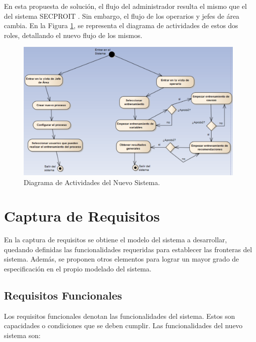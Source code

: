 En esta propuesta de solución, el flujo del administrador resulta el mismo que el del sistema SECPROIT \cite{elena}. Sin embargo, el flujo de los operarios y jefes de área cambia. En la Figura \ref{fig:actividades}, se representa el diagrama de actividades de estos dos roles, detallando el nuevo flujo de los mismos.

\begin{figure}[h]
\centering
 \includegraphics[width=0.8\linewidth]{imagen/actividades.png}
 \caption{Diagrama de Actividades del Nuevo Sistema.}
 \label{fig:actividades} 
\end{figure} 


\section{Captura de Requisitos}
En la captura de requisitos se obtiene el modelo del sistema a desarrollar, quedando definidas las funcionalidades requeridas para establecer las fronteras del sistema. Además, se proponen otros elementos para lograr un mayor grado de especificación en el propio modelado del sistema.

\subsection{Requisitos Funcionales}
Los requisitos funcionales denotan las funcionalidades del sistema. Estos son 
capacidades o condiciones que se deben cumplir. Las funcionalidades del nuevo sistema son:

